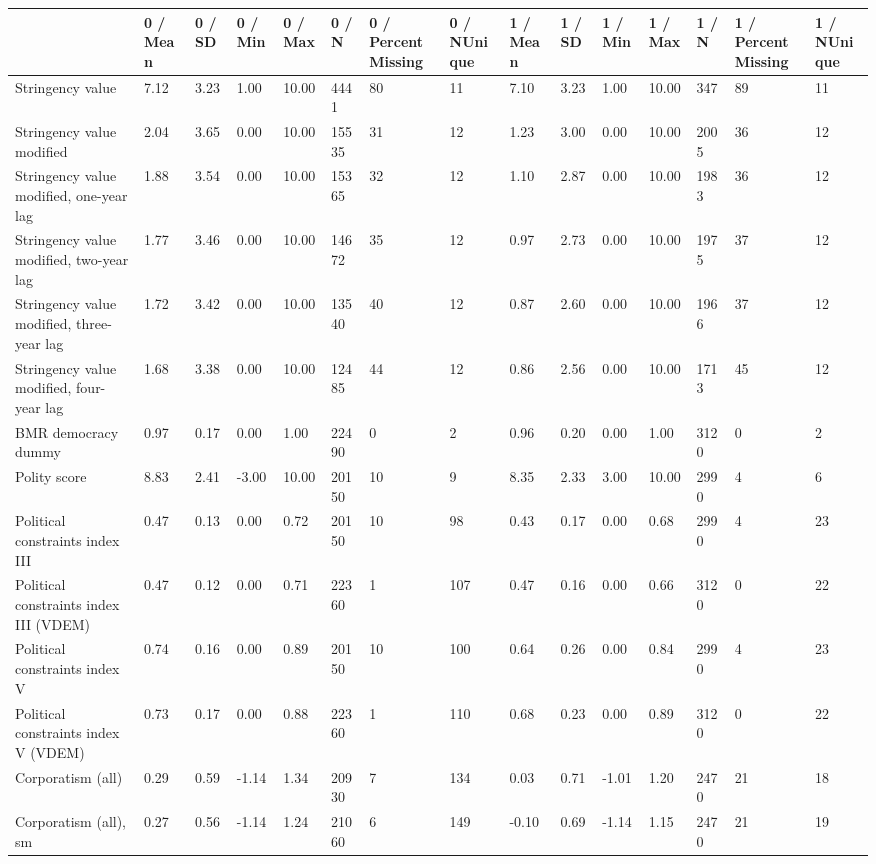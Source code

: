 
\begin{longtable}{lllllllllllllll}
\toprule
  & 0 / Mean & 0 / SD & 0 / Min & 0 / Max & 0 / N & 0 / PercentMissing & 0 / NUnique & 1 / Mean & 1 / SD & 1 / Min & 1 / Max & 1 / N & 1 / PercentMissing & 1 / NUnique\\
\midrule
Stringency value & 7.12 & 3.23 & 1.00 & 10.00 & 4441 & 80 & 11 & 7.10 & 3.23 & 1.00 & 10.00 & 347 & 89 & 11\\
Stringency value modified & 2.04 & 3.65 & 0.00 & 10.00 & 15535 & 31 & 12 & 1.23 & 3.00 & 0.00 & 10.00 & 2005 & 36 & 12\\
Stringency value modified, one-year lag & 1.88 & 3.54 & 0.00 & 10.00 & 15365 & 32 & 12 & 1.10 & 2.87 & 0.00 & 10.00 & 1983 & 36 & 12\\
Stringency value modified, two-year lag & 1.77 & 3.46 & 0.00 & 10.00 & 14672 & 35 & 12 & 0.97 & 2.73 & 0.00 & 10.00 & 1975 & 37 & 12\\
Stringency value modified, three-year lag & 1.72 & 3.42 & 0.00 & 10.00 & 13540 & 40 & 12 & 0.87 & 2.60 & 0.00 & 10.00 & 1966 & 37 & 12\\
\addlinespace
Stringency value modified, four-year lag & 1.68 & 3.38 & 0.00 & 10.00 & 12485 & 44 & 12 & 0.86 & 2.56 & 0.00 & 10.00 & 1713 & 45 & 12\\
BMR democracy dummy & 0.97 & 0.17 & 0.00 & 1.00 & 22490 & 0 & 2 & 0.96 & 0.20 & 0.00 & 1.00 & 3120 & 0 & 2\\
Polity score & 8.83 & 2.41 & -3.00 & 10.00 & 20150 & 10 & 9 & 8.35 & 2.33 & 3.00 & 10.00 & 2990 & 4 & 6\\
Political constraints index III & 0.47 & 0.13 & 0.00 & 0.72 & 20150 & 10 & 98 & 0.43 & 0.17 & 0.00 & 0.68 & 2990 & 4 & 23\\
Political constraints index III (VDEM) & 0.47 & 0.12 & 0.00 & 0.71 & 22360 & 1 & 107 & 0.47 & 0.16 & 0.00 & 0.66 & 3120 & 0 & 22\\
\addlinespace
Political constraints index V & 0.74 & 0.16 & 0.00 & 0.89 & 20150 & 10 & 100 & 0.64 & 0.26 & 0.00 & 0.84 & 2990 & 4 & 23\\
Political constraints index V (VDEM) & 0.73 & 0.17 & 0.00 & 0.88 & 22360 & 1 & 110 & 0.68 & 0.23 & 0.00 & 0.89 & 3120 & 0 & 22\\
Corporatism (all) & 0.29 & 0.59 & -1.14 & 1.34 & 20930 & 7 & 134 & 0.03 & 0.71 & -1.01 & 1.20 & 2470 & 21 & 18\\
Corporatism (all), sm & 0.27 & 0.56 & -1.14 & 1.24 & 21060 & 6 & 149 & -0.10 & 0.69 & -1.14 & 1.15 & 2470 & 21 & 19\\

\end{longtable}
